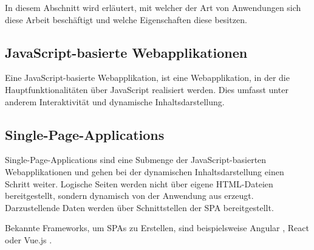 

In diesem Abschnitt wird erläutert, mit welcher der Art von Anwendungen sich diese Arbeit beschäftigt und welche Eigenschaften diese besitzen.

\subsection{JavaScript-basierte Webapplikationen}

Eine JavaScript-basierte Webapplikation, ist eine Webapplikation, in der die Hauptfunktionalitäten über JavaScript realisiert werden. Dies umfasst unter anderem Interaktivität und dynamische Inhaltsdarstellung.

\subsection{Single-Page-Applications}

Single-Page-Applications sind eine Submenge der JavaScript-basierten Webapplikationen und gehen bei der dynamischen Inhaltsdarstellung einen Schritt weiter. Logische Seiten werden nicht über eigene HTML-Dateien bereitgestellt, sondern dynamisch von der Anwendung aus erzeugt. Darzustellende Daten werden über Schnittstellen der SPA bereitgestellt.

Bekannte Frameworks, um SPAs zu Erstellen, sind beispielsweise Angular \cite{AngularHomepage}, React \cite{ReactHomepage} oder Vue.js \cite{VueJSHomepage}.